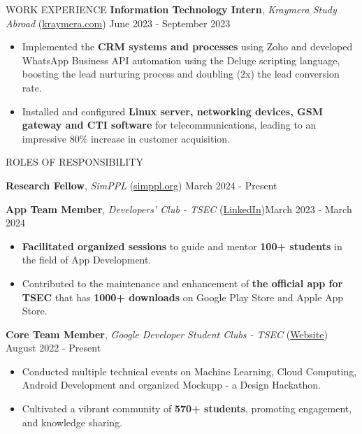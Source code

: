 \documentclass{resume} %
\begin{document}
\begin{rSection}{WORK EXPERIENCE}
    \textbf{Information Technology Intern}, \textit{Kraymera Study Abroad} (\href{https://kraymera.com}{kraymera.com})  \hfill June 2023 - September 2023

    \begin{itemize}
        \itemsep -6pt {}
        \item Implemented the \textbf{CRM systems and processes} using Zoho and developed WhatsApp Business API automation using the Deluge scripting language, boosting the lead nurturing process and doubling (2x) the lead conversion rate.
        \item Installed and configured \textbf{Linux server, networking devices, GSM gateway and CTI software} for telecommunications, leading to an impressive 80\% increase in customer acquisition.
    \end{itemize}
\end{rSection}

\begin{rSection}{ROLES OF RESPONSIBILITY}

    \textbf{Research Fellow}, \textit{SimPPL} (\href{https://simppl.org/}{simppl.org}) \hfill March 2024 - Present

    \textbf{App Team Member}, \textit{Developers' Club - TSEC} (\href{https://www.linkedin.com/in/developer-s-club-tsec/}{LinkedIn})\hfill March 2023 - March 2024
    \begin{itemize}
        \itemsep -6pt {}
        \item \textbf{Facilitated organized sessions} to guide and mentor \textbf{100+ students} in the field of App Development.
        \item Contributed to the maintenance and enhancement of \textbf{the official app for TSEC} that has \textbf{1000+ downloads} on Google Play Store and Apple App Store.
    \end{itemize}

    \textbf{Core Team Member}, \textit{Google Developer Student Clubs - TSEC} (\href{https://gdsc.community.dev/thadomal-shahani-engineering-college-mumbai/}{Website})  \hfill August 2022 - Present
    \begin{itemize}
        \itemsep -6pt {}
        \item Conducted multiple technical events on Machine Learning, Cloud Computing, Android Development and organized Mockupp - a Design Hackathon.
        \item Cultivated a vibrant community of \textbf{570+ students}, promoting engagement, and knowledge sharing.
    \end{itemize}

\end{rSection}
\end{document}
